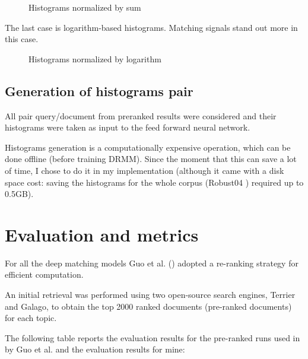 \begin{figure}[H]
  \centering
  \hfill
  \caption{Histograms normalized by sum}
  \label{fig:hist_nh_ex}
\end{figure}

The last case is logarithm-based histograms. Matching signals stand out more in this case.

\begin{figure}[H]
  \centering
  \hfill
  \caption{Histograms normalized by logarithm}
  \label{fig:hist_lch_sample}
\end{figure}

\subsection{Generation of histograms pair}

All pair query/document from preranked results were considered and their histograms were taken as input to the feed forward neural network.

Histograms generation is a computationally expensive operation, which can be done offline (before training DRMM). Since the moment that this can save a lot of time, I chose to do it in my implementation (although it came with a disk space cost: saving the histograms for the whole corpus (Robust04 \cite{rob04}) required up to 0.5GB).

\section{Evaluation and metrics}
\label{sec:comparison}

For all the deep matching models Guo et al. (\cite{drmm}) adopted a re-ranking strategy for efficient computation.

An initial retrieval was performed using two open-source search engines, Terrier and Galago, to obtain the top 2000 ranked documents (pre-ranked documents) for each topic.

The following table reports the evaluation results for the pre-ranked runs used in \cite{drmm} by Guo et al. and the evaluation results for mine:

